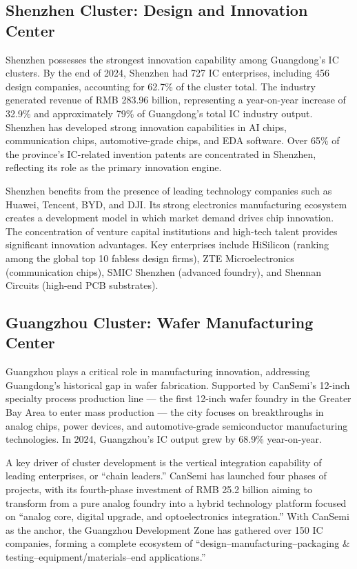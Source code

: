 \documentclass[12pt,a4paper]{article}
\begin{document}
\subsection{Shenzhen Cluster: Design and Innovation Center}
\label{sec:sz_cluster}

Shenzhen possesses the strongest innovation capability among Guangdong's
IC clusters. By the end of 2024, Shenzhen had 727 IC enterprises,
including 456 design companies, accounting for 62.7\% of the cluster total.
The industry generated revenue of RMB 283.96 billion, representing a
year-on-year increase of 32.9\% and approximately 79\% of Guangdong's
total IC industry output. Shenzhen has developed strong innovation
capabilities in AI chips, communication chips, automotive-grade chips,
and EDA software. Over 65\% of the province's IC-related invention patents
are concentrated in Shenzhen, reflecting its role as the primary
innovation engine.

Shenzhen benefits from the presence of leading technology companies such
as Huawei, Tencent, BYD, and DJI. Its strong electronics manufacturing
ecosystem creates a development model in which market demand drives chip
innovation. The concentration of venture capital institutions and
high-tech talent provides significant innovation advantages. Key
enterprises include HiSilicon (ranking among the global top 10 fabless
design firms), ZTE Microelectronics (communication chips), SMIC Shenzhen
(advanced foundry), and Shennan Circuits (high-end PCB substrates).

\subsection{Guangzhou Cluster: Wafer Manufacturing Center}
\label{sec:gz_cluster}

Guangzhou plays a critical role in manufacturing innovation, addressing
Guangdong's historical gap in wafer fabrication. Supported by CanSemi's
12-inch specialty process production line — the first 12-inch wafer
foundry in the Greater Bay Area to enter mass production — the city
focuses on breakthroughs in analog chips, power devices, and
automotive-grade semiconductor manufacturing technologies. In 2024,
Guangzhou's IC output grew by 68.9\% year-on-year.

A key driver of cluster development is the vertical integration
capability of leading enterprises, or ``chain leaders.'' CanSemi has
launched four phases of projects, with its fourth-phase investment of
RMB 25.2 billion aiming to transform from a pure analog foundry into a
hybrid technology platform focused on ``analog core, digital upgrade,
and optoelectronics integration.'' With CanSemi as the anchor, the
Guangzhou Development Zone has gathered over 150 IC companies, forming a
complete ecosystem of ``design--manufacturing--packaging \&
testing--equipment/materials--end applications.''
\end{document}
